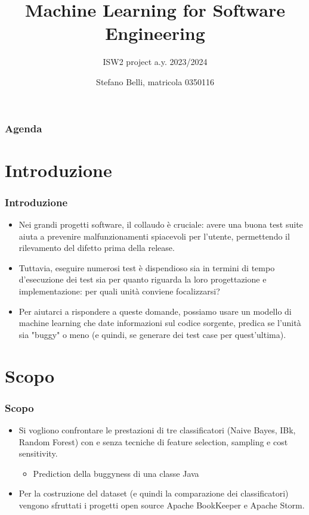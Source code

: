 \documentclass{beamer}
\title[ML for SE]{Machine Learning for Software Engineering}
\subtitle{ISW2 project a.y. 2023/2024}
\author[Stefano Belli, 0350116]{Stefano Belli, matricola 0350116}
\institute[uniroma2]{Università degli Studi di Roma "Tor Vergata"}
\date{}
\begin{document}
\begin{frame}[plain]
    \titlepage
\end{frame}

\begin{frame}
    \frametitle{Agenda}
    \fontsize{8pt}{10pt}\selectfont
    \tableofcontents
\end{frame}

\section{Introduzione}
\begin{frame}
	\frametitle{Introduzione}
	
	\begin{itemize}
		\setlength\itemsep{10pt}
	
		\item Nei grandi progetti software, il collaudo è cruciale: avere una buona test suite aiuta a prevenire
		malfunzionamenti spiacevoli per l'utente, permettendo il rilevamento del difetto prima della release.
	
		\item Tuttavia, eseguire numerosi test è dispendioso sia in termini di tempo d'esecuzione dei test sia per
		quanto riguarda la loro progettazione e implementazione: per quali unità conviene focalizzarsi?
		
		\item Per aiutarci a rispondere a queste domande, possiamo usare un modello di machine learning che 
		date informazioni sul codice sorgente, predica se l'unità sia "buggy" o meno
		(e quindi, se generare dei test case per quest'ultima).
	\end{itemize}
\end{frame}

\section{Scopo}
\begin{frame}
	\frametitle{Scopo}
	
	\begin{itemize}
		\setlength\itemsep{10pt}
		
		\item Si vogliono confrontare le prestazioni di tre classificatori (Naive Bayes, IBk, Random Forest) con e
		senza tecniche di feature selection, sampling e cost sensitivity.
		\begin{itemize}
			\item Prediction della buggyness di una classe Java
		\end{itemize}
	
		\item Per la costruzione del dataset (e quindi la comparazione dei classificatori)
		vengono sfruttati i progetti open source Apache BookKeeper e Apache Storm.
	\end{itemize}
\end{frame}
\end{document}
